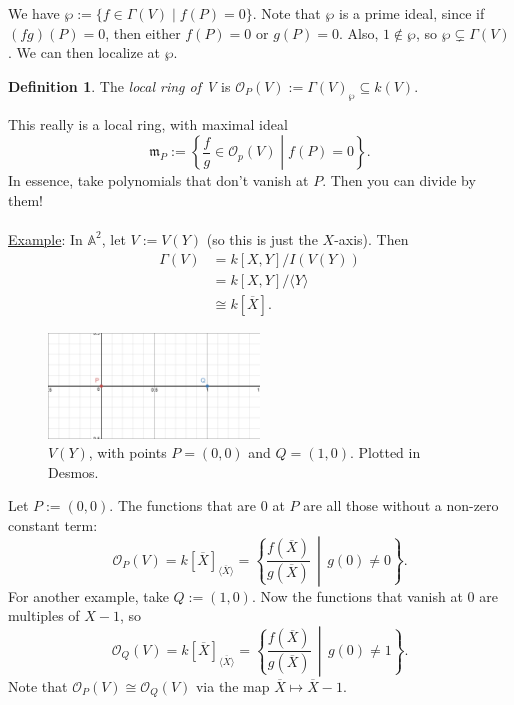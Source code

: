 \documentclass[12pt]{article}
\newcommand{\ita}[1]{\textit{#1}}
\newcommand{\vbrack}[1]{\langle #1\rangle}
\theoremstyle{definition}
\newtheorem{definition}[theorem]{Definition}
\begin{document}
We have $\wp:=\{f\in\Gamma(V)\mid f(P)=0\}$. Note that $\wp$ is a prime ideal, since if $(fg)(P)=0$, then either $f(P)=0$ or $g(P)=0$. Also, $1\notin\wp$, so $\wp\subsetneq\Gamma(V)$. We can then localize at $\wp$.
\begin{definition}
    The \ita{local ring of V} is $\mathcal{O}_P(V):=\Gamma(V)_{\wp}\subseteq k(V)$.
\end{definition}
This really is a local ring, with maximal ideal
\begin{equation}
    \mathfrak{m}_P:=\left\{\frac{f}{g}\in\mathcal{O}_p(V)\middle|f(P)=0\right\}.
\end{equation}
In essence, take polynomials that don't vanish at $P$. Then you can divide by them!\\\\
\underline{Example}: In $\mathbb{A}^2$, let $V:=V(Y)$ (so this is just the $X$-axis). Then
\begin{align*}
    \Gamma(V)&=k[X,Y]/I(V(Y))\\
    &=k[X,Y]/\vbrack{Y}\\
    &\cong k[\overline{X}].
\end{align*}
\begin{figure}[H]
    \centering
    \includegraphics[width=0.5\textwidth]{15.png}
    \caption{$V(Y)$, with points $P=(0,0)$ and $Q=(1,0)$. Plotted in Desmos.}
\end{figure}
Let $P:=(0,0)$. The functions that are $0$ at $P$ are all those without a non-zero constant term:
\[\mathcal{O}_P(V)=k[\overline{X}]_{\vbrack{\overline{X}}}=\left\{\frac{f(\overline{X})}{g(\overline{X})}\,\middle|\,g(0)\neq0\right\}.\]
For another example, take $Q:=(1,0)$. Now the functions that vanish at $0$ are multiples of $X-1$, so 
\[\mathcal{O}_Q(V)=k[\overline{X}]_{\vbrack{\overline{X}}}=\left\{\frac{f(\overline{X})}{g(\overline{X})}\,\middle|\,g(0)\neq1\right\}.\]
Note that $\mathcal{O}_P(V)\cong\mathcal{O}_Q(V)$ via the map $\overline{X}\mapsto\overline{X}-1$.
\end{document}
